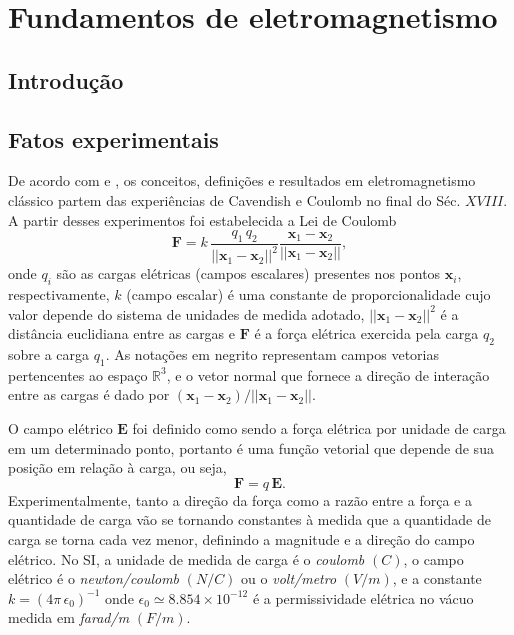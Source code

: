 \chapter{Fundamentos de eletromagnetismo}\label{sec.fund_eletr}

\section{Introdução}

\section{Fatos experimentais}
De acordo com \cite{jackson_classical_1999} e \cite{sommerfeld_52} , os conceitos, definições e resultados em eletromagnetismo clássico partem das experiências de Cavendish e Coulomb no final do Séc. $XVIII$. A partir desses experimentos foi estabelecida a Lei de Coulomb
\begin{equation}\label{eq.forc_elet}
\textbf{F}=k\,\frac{q_1\,q_2}{||\textbf{x}_1-\textbf{x}_2||^2}\frac{\textbf{x}_1-\textbf{x}_2}{||\textbf{x}_1-\textbf{x}_2||},
\end{equation}
onde $q_i$ são as cargas elétricas (campos escalares) presentes nos pontos $\textbf{x}_i$, respectivamente, $k$ (campo escalar) é uma constante de proporcionalidade cujo valor depende do sistema de unidades de medida adotado, $||\textbf{x}_1-\textbf{x}_2||^2$ é a distância euclidiana entre as cargas e $\textbf{F}$ é a força elétrica exercida pela carga $q_2$ sobre a carga $q_1$. As notações em negrito representam campos vetorias pertencentes ao espaço $\mathbb{R}^3$, e o vetor normal que fornece a direção de interação entre as cargas é dado por $(\textbf{x}_1-\textbf{x}_2)/||\textbf{x}_1-\textbf{x}_2||$.

O campo elétrico $\textbf{E}$ foi definido como sendo a força elétrica por unidade de carga em um determinado ponto, portanto é uma função vetorial que depende de sua posição em relação à carga, ou seja,
\begin{equation}\label{eq.camp_elet}
\textbf{F}=q\,\textbf{E}.
\end{equation}
Experimentalmente, tanto a direção da força como a razão entre a força e a quantidade de carga vão se tornando constantes à medida que a quantidade de carga se torna cada vez menor, definindo a magnitude e a direção do campo elétrico. No SI, a unidade de medida de carga é o \textit{coulomb} $(C)$, o campo elétrico é o \textit{newton/coulomb} $(N/C)$ ou o \textit{volt/metro} $(V/m)$, e a constante $k=(4\pi\,\epsilon_0)^{-1}$ onde $\epsilon_0\simeq8.854\times10^{-12}$ é a permissividade elétrica no vácuo medida em \textit{farad/m} $(F/m)$.


